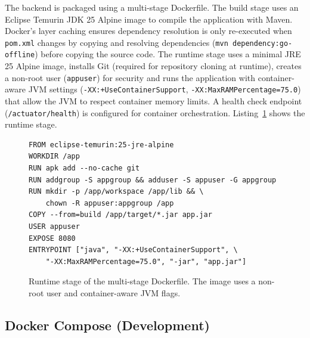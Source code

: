 \par The backend is packaged using a multi-stage Dockerfile. The build stage uses an Eclipse Temurin JDK 25 Alpine image to compile the application with Maven. Docker's layer caching ensures dependency resolution is only re-executed when \texttt{pom.xml} changes by copying and resolving dependencies (\texttt{mvn dependency:go-offline}) before copying the source code. The runtime stage uses a minimal JRE 25 Alpine image, installs Git (required for repository cloning at runtime), creates a non-root user (\texttt{appuser}) for security and runs the application with container-aware JVM settings (\texttt{-XX:+UseContainerSupport}, \texttt{-XX:MaxRAMPercentage=75.0}) that allow the JVM to respect container memory limits. A health check endpoint (\texttt{/actuator/health}) is configured for container orchestration. Listing~\ref{lst:dockerfile-runtime} shows the runtime stage.

\begin{figure}[htbp]
    \begin{verbatim}
FROM eclipse-temurin:25-jre-alpine
WORKDIR /app
RUN apk add --no-cache git
RUN addgroup -S appgroup && adduser -S appuser -G appgroup
RUN mkdir -p /app/workspace /app/lib && \
    chown -R appuser:appgroup /app
COPY --from=build /app/target/*.jar app.jar
USER appuser
EXPOSE 8080
ENTRYPOINT ["java", "-XX:+UseContainerSupport", \
    "-XX:MaxRAMPercentage=75.0", "-jar", "app.jar"]
    \end{verbatim}
    \caption{Runtime stage of the multi-stage Dockerfile. The image uses a non-root user and container-aware JVM flags.}
    \label{lst:dockerfile-runtime}
\end{figure}

\subsection{Docker Compose (Development)}
\label{subsec:docker-dev}

